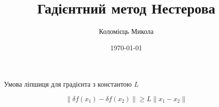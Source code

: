 \documentclass[a4paper, 14pt]{beamer}
\title{Гадієнтний метод Нестерова}
\author{Коломієць Микола}
\date{\today}
\begin{document}
\maketitle

\begin{frame}

    \begin{theorem}
        Умова ліпшиця для градієнта з константою $L$

        $$\|\delta f(x_1) - \delta f(x_2) \| \geq L \|x_1 - x_2 \| $$
    \end{theorem}
    
\end{frame}
\end{document}
